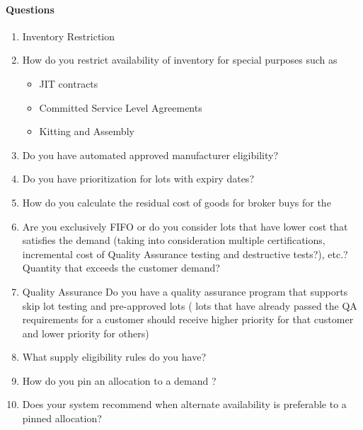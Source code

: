 \documentclass[letterpaper,10pt,english]{sphinxmanual}
\begin{document}
\paragraph{Questions}
\label{\detokenize{FutureState:questions}}\begin{enumerate}
%
\item {} 
Inventory Restriction

\item {} 
How do you restrict availability of inventory for special purposes
such as
\begin{itemize}
\item {} 
JIT contracts

\item {} 
Committed Service Level Agreements

\item {} 
Kitting and Assembly

\end{itemize}

\item {} 
Do you have automated approved manufacturer eligibility?

\item {} 
Do you have prioritization for lots with expiry dates?

\item {} 
How do you calculate the residual cost of goods for broker buys for
the

\item {} 
Are you exclusively FIFO or do you consider lots that have lower cost
that satisfies the demand (taking into consideration multiple
certifications, incremental cost of Quality Assurance testing and
destructive tests?), etc.? Quantity that exceeds the customer demand?

\item {} 
Quality Assurance Do you have a quality assurance program that
supports skip lot testing and pre-approved lots ( lots that have
already passed the QA requirements for a customer should receive
higher priority for that customer and lower priority for others)

\item {} 
What supply eligibility rules do you have?

\item {} 
How do you pin an allocation to a demand ?

\item {} 
Does your system recommend when alternate availability is preferable
to a pinned allocation?

\end{enumerate}
\end{document}
